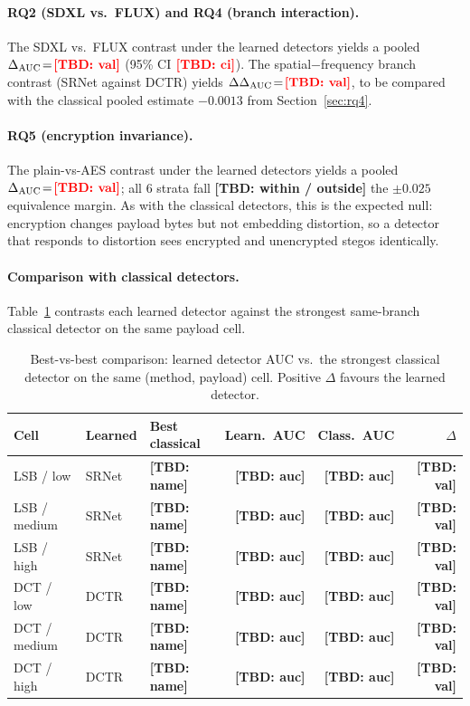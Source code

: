 \documentclass[10pt,twocolumn,a4paper]{article}
\newcommand{\TBD}[1]{\textbf{\color{red}[TBD: #1]}}
\begin{document}
\paragraph{RQ2 (SDXL vs.\ FLUX) and RQ4 (branch interaction).} The SDXL vs.\ FLUX contrast under the learned detectors yields a pooled $\Delta_\text{AUC}\!=\!\TBD{val}$ (95\% CI $\TBD{ci}$). The spatial$-$frequency branch contrast (SRNet against DCTR) yields $\Delta\Delta_\text{AUC}\!=\!\TBD{val}$, to be compared with the classical pooled estimate $-0.0013$ from Section~\ref{sec:rq4}.

\paragraph{RQ5 (encryption invariance).} The plain-vs-AES contrast under the learned detectors yields a pooled $\Delta_\text{AUC}\!=\!\TBD{val}$; all 6 strata fall \TBD{within / outside} the $\pm0.025$ equivalence margin. As with the classical detectors, this is the expected null: encryption changes payload bytes but not embedding distortion, so a detector that responds to distortion sees encrypted and unencrypted stegos identically.

\paragraph{Comparison with classical detectors.} Table~\ref{tab:learned-vs-classical} contrasts each learned detector against the strongest same-branch classical detector on the same payload cell.

\begin{table}[h]
\centering\small
\caption{Best-vs-best comparison: learned detector AUC vs.\ the strongest classical detector on the same (method, payload) cell. Positive $\Delta$ favours the learned detector.}
\label{tab:learned-vs-classical}
\setlength{\tabcolsep}{4pt}\renewcommand{\arraystretch}{1.1}
\begin{tabular}{@{}lllrrr@{}}
\toprule
\textbf{Cell} & \textbf{Learned} & \textbf{Best classical} & \textbf{Learn.\ AUC} & \textbf{Class.\ AUC} & \textbf{$\Delta$} \\
\midrule
LSB / low     & SRNet & \TBD{name} & \TBD{auc} & \TBD{auc} & \TBD{val} \\
LSB / medium  & SRNet & \TBD{name} & \TBD{auc} & \TBD{auc} & \TBD{val} \\
LSB / high    & SRNet & \TBD{name} & \TBD{auc} & \TBD{auc} & \TBD{val} \\
DCT / low     & DCTR  & \TBD{name} & \TBD{auc} & \TBD{auc} & \TBD{val} \\
DCT / medium  & DCTR  & \TBD{name} & \TBD{auc} & \TBD{auc} & \TBD{val} \\
DCT / high    & DCTR  & \TBD{name} & \TBD{auc} & \TBD{auc} & \TBD{val} \\
\bottomrule
\end{tabular}
\end{table}
\end{document}
